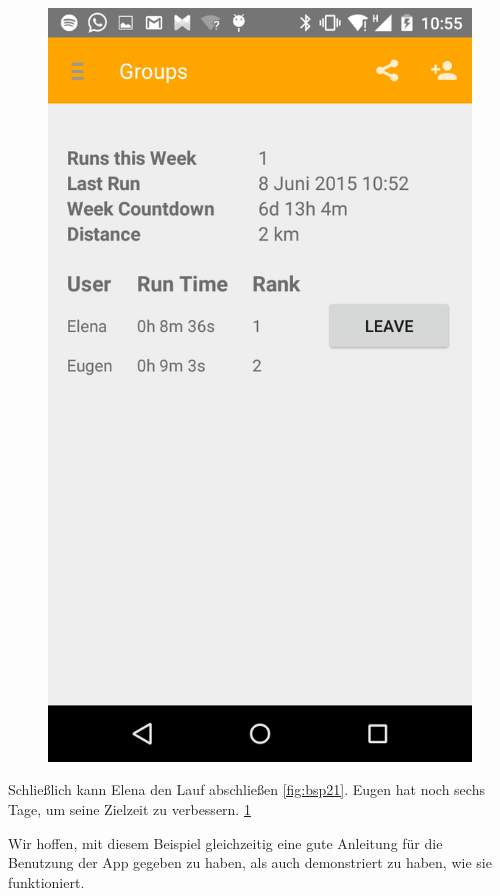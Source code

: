 \begin{figure}
\begin{minipage}{.4\textwidth}
  \includegraphics[width=.8\linewidth]{abb/bsp/bsp22}
  \label{fig:bsp22}
\end{minipage}
\end{figure}

Schließlich kann Elena den Lauf abschließen \ref{fig:bsp21}. Eugen hat noch sechs Tage, um seine Zielzeit zu verbessern. \ref{fig:bsp22}

Wir hoffen, mit diesem Beispiel gleichzeitig eine gute Anleitung für die Benutzung der App gegeben zu haben, als auch demonstriert zu haben, wie sie funktioniert.